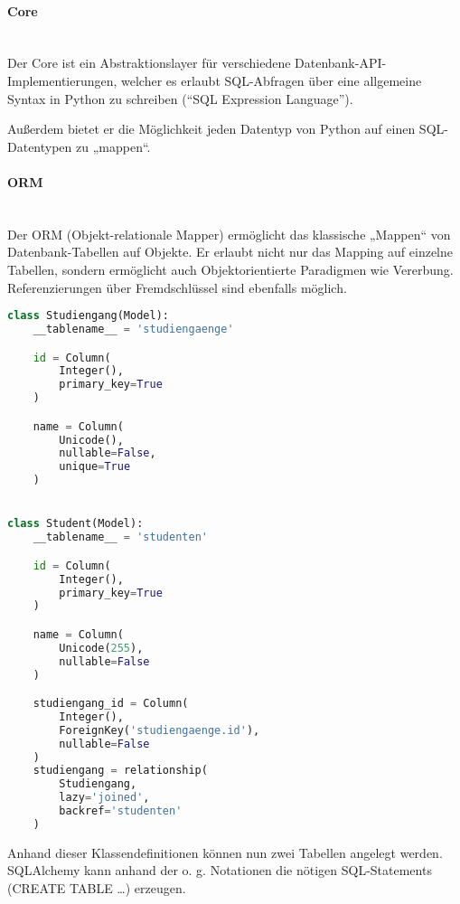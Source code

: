 \paragraph{Core} \hspace{0pt} \\
Der Core ist ein Abstraktionslayer für verschiedene Datenbank-API-Implementierungen, welcher es erlaubt SQL-Abfragen über eine allgemeine Syntax in Python zu schreiben ("`SQL Expression Language"').


Außerdem bietet er die Möglichkeit jeden Datentyp von Python auf einen SQL-Datentypen zu „mappen“.

\paragraph{ORM} \hspace{0pt} \\
Der ORM (Objekt-relationale Mapper) ermöglicht das klassische „Mappen“ von Datenbank-Tabellen auf Objekte. Er erlaubt nicht nur das Mapping auf einzelne Tabellen, sondern ermöglicht auch Objektorientierte Paradigmen wie Vererbung. Referenzierungen über Fremdschlüssel sind ebenfalls möglich.

\begin{lstlisting}[language=Python]
class Studiengang(Model):
    __tablename__ = 'studiengaenge'

    id = Column(
        Integer(),
        primary_key=True
    )

    name = Column(
        Unicode(),
        nullable=False,
        unique=True
    )


class Student(Model):
    __tablename__ = 'studenten'

    id = Column(
        Integer(),
        primary_key=True
    )

    name = Column(
        Unicode(255),
        nullable=False
    )

    studiengang_id = Column(
        Integer(),
        ForeignKey('studiengaenge.id'),
        nullable=False
    )
    studiengang = relationship(
        Studiengang,
        lazy='joined',
        backref='studenten'
    )
\end{lstlisting}


Anhand dieser Klassendefinitionen können nun zwei Tabellen angelegt werden. SQLAlchemy kann anhand der o. g. Notationen die nötigen SQL-Statements (CREATE TABLE …) erzeugen.

\hspace{1.0pt}

